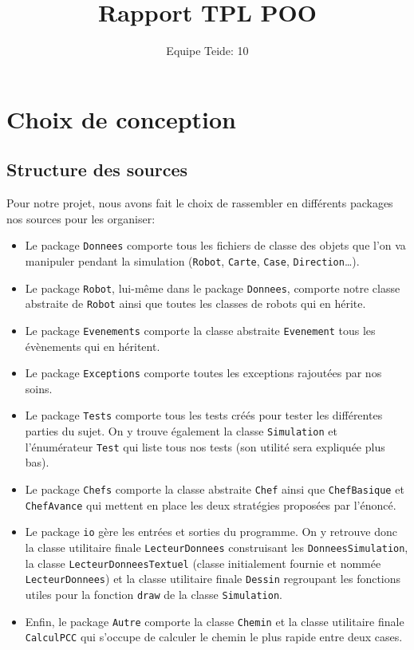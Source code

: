 \documentclass[a4paper,8pt]{article} %
\title{Rapport TPL POO}
\author{Equipe Teide: 10}
\date{} %
\begin{document}
\maketitle
\section{Choix de conception}
\subsection{Structure des sources} %
Pour notre projet, nous avons fait le choix de rassembler en différents packages nos sources pour les organiser: 
\begin{itemize}
    \item Le package \texttt{Donnees} comporte tous les fichiers de classe des objets que l'on va manipuler pendant
    la simulation (\texttt{Robot}, \texttt{Carte}, \texttt{Case}, \texttt{Direction}\ldots).
    \item Le package \texttt{Robot}, lui-même dans le package \texttt{Donnees}, comporte notre classe abstraite de \texttt{Robot} ainsi
    que toutes les classes de robots qui en hérite.
    \item Le package \texttt{Evenements} comporte la classe abstraite \texttt{Evenement} tous les évènements qui en héritent.
    \item Le package \texttt{Exceptions} comporte toutes les exceptions rajoutées par nos soins.
    \item Le package \texttt{Tests} comporte tous les tests créés pour tester les différentes parties du sujet. On y trouve également
    la classe \texttt{Simulation} et l'énumérateur \texttt{Test} qui liste tous nos tests (son utilité sera expliquée plus bas).
    \item Le package \texttt{Chefs} comporte la classe abstraite \texttt{Chef} ainsi que \texttt{ChefBasique} et \texttt{ChefAvance} qui mettent
    en place les deux stratégies proposées par l'énoncé.
    \item Le package \texttt{io} gère les entrées et sorties du programme. 
    On y retrouve donc la classe utilitaire finale \texttt{LecteurDonnees} construisant les \texttt{DonneesSimulation}, la classe 
    \texttt{LecteurDonneesTextuel} (classe initialement fournie et nommée \texttt{LecteurDonnees}) et la classe utilitaire finale 
    \texttt{Dessin} regroupant les fonctions utiles pour la fonction \texttt{draw} de la classe \texttt{Simulation}. 
    \item Enfin, le package \texttt{Autre} comporte la classe \texttt{Chemin} et la classe utilitaire finale \texttt{CalculPCC} 
    qui s'occupe de calculer le chemin le plus rapide entre deux cases.
    
\end{itemize}
\end{document}
